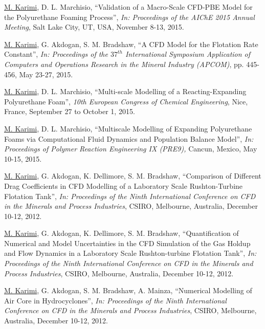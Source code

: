 \documentclass[10pt,a4]{article}
\newcounter{myEnumCounter}
\newcounter{mySaveCounter}
\renewenvironment{enumerate}{%
  \begin{list}{\arabic{myEnumCounter}.}{\usecounter{myEnumCounter}%
  \setcounter{myEnumCounter}{\value{mySaveCounter}}}
  }{%
  \setcounter{mySaveCounter}{\value{myEnumCounter}}\end{list}%
}
\newcommand{\quotes}[1]{``#1''}
\begin{document}
\begin{small}
\begin{enumerate}
	\item
\underline{M. Karimi}, D. L. Marchisio, \quotes{Validation of a Macro-Scale CFD-PBE Model for the Polyurethane Foaming Process}, \textit{In: Proceedings of the AIChE 2015 Annual Meeting}, Salt Lake City, UT, USA, November 8-13, 2015.
	
	\item 
\underline{M. Karimi}, G. Akdogan, S. M. Bradshaw, \quotes{A CFD Model for the Flotation Rate Constant}, \textit{In: Proceedings of the $37^{th}$ International Symposium Application of Computers and Operations Research in the Mineral Industry (APCOM)}, pp. 445-456, May 23-27, 2015.	
	
	\item 
\underline{M. Karimi}, D. L. Marchisio, \quotes{Multi-scale Modelling of a Reacting-Expanding Polyurethane Foam}, \textit{10th European Congress of Chemical Engineering}, Nice, France, September 27 to October 1, 2015.	

	\item
\underline{M. Karimi}, D. L. Marchisio, \quotes{Multiscale Modelling of Expanding Polyurethane Foams via Computational Fluid Dynamics and Population Balance Model}, \textit{In: Proceedings of Polymer Reaction Engineering IX (PRE9),} Cancun, Mexico, May 10-15, 2015.


	\item
\underline{M. Karimi}, G. Akdogan, K. Dellimore, S. M. Bradshaw, \quotes{Comparison of Different Drag Coefficients in CFD Modelling of a Laboratory Scale Rushton-Turbine Flotation Tank}, \textit{In: Proceedings of the Ninth International Conference on CFD in the Minerals and Process Industries}, CSIRO, Melbourne, Australia, December 10-12, 2012.
	
	\item
\underline{M. Karimi}, G. Akdogan, K. Dellimore, S. M. Bradshaw, \quotes{Quantification of Numerical and Model Uncertainties in the CFD Simulation of the Gas Holdup and Flow Dynamics in a Laboratory Scale Rushton-turbine Flotation Tank}, \textit{In: Proceedings of the Ninth International Conference on CFD in the Minerals and Process Industries}, CSIRO, Melbourne, Australia, December 10-12, 2012.

	\item 
\underline{M. Karimi}, G. Akdogan, S. M. Bradshaw, A. Mainza,  \quotes{Numerical Modelling of Air Core in Hydrocyclones}, \textit{In: Proceedings of the Ninth International Conference on CFD in the Minerals and Process Industries}, CSIRO, Melbourne, Australia, December 10-12, 2012.


\end{enumerate}
\end{small}
\end{document}
